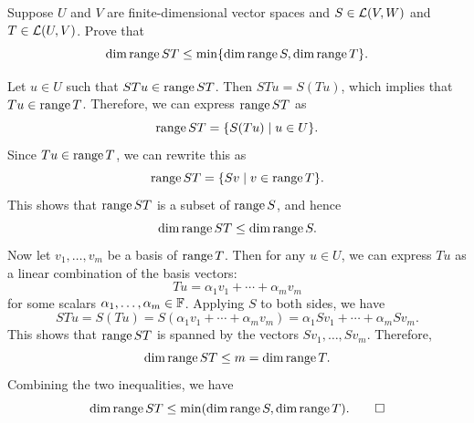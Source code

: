 \begin{exc}
\begin{exercise}
Suppose $U$ and $V$ are finite-dimensional vector spaces and $S\in\mathcal{L}(V,W)$
and $T\in\mathcal{L}(U,V)$. Prove that
\[ \operatorname{dim}\operatorname{range} ST\le\min\{\operatorname{dim}\operatorname{range} S,\operatorname{dim}\operatorname{range} T\}. \]
\end{exercise}
\begin{solution}
Let $u\in U$ such that $STu\in\operatorname{range} ST$. Then $STu=S(Tu)$, which implies that
$Tu\in\operatorname{range} T$. Therefore, we can express $\operatorname{range} ST$ as
\[ \operatorname{range} ST=\{S(Tu)\mid u\in U\}. \]
Since $Tu\in\operatorname{range} T$, we can rewrite this as
\[ \operatorname{range} ST=\{Sv\mid v\in\operatorname{range} T\}. \]
This shows that $\operatorname{range} ST$ is a subset of $\operatorname{range} S$, and hence
\[ \operatorname{dim}\operatorname{range} ST\le\operatorname{dim}\operatorname{range} S. \]
Now let $v_1,\dots,v_m$ be a basis of $\operatorname{range} T$. Then for any $u\in U$, we can
express $Tu$ as a linear combination of the basis vectors:
\[ Tu=\alpha_1v_1+\cdots+\alpha_mv_m \]
for some scalars $\alpha_1,\dots,\alpha_m\in\mathbb{F}$. Applying $S$ to both sides, we
have
\[ STu=S(Tu)=S(\alpha_1v_1+\cdots+\alpha_mv_m)=\alpha_1Sv_1+\cdots+\alpha_mSv_m. \]
This shows that $\operatorname{range} ST$ is spanned by the vectors $Sv_1,\dots,Sv_m$.
Therefore,
\[ \operatorname{dim}\operatorname{range} ST\le m=\operatorname{dim}\operatorname{range} T. \]
Combining the two inequalities, we have
\[ \operatorname{dim}\operatorname{range} ST\le\min(\operatorname{dim}\operatorname{range} S,\operatorname{dim}\operatorname{range} T). \qedhere \]
\end{solution}


\end{exc}
